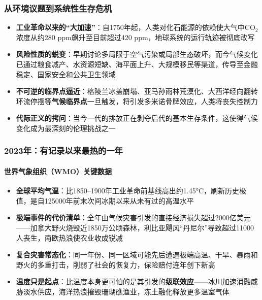 \documentclass[11pt]{beamer}
\begin{document}
\begin{frame}
\frametitle{从环境议题到系统性生存危机}
\begin{itemize}
    \item \textbf{工业革命以来的“大加速”}：自1750年起，人类对化石能源的依赖使大气中CO$_2$浓度从约280 ppm飙升至目前超过420 ppm，地球系统的运行轨迹被彻底改写
    \item \textbf{风险性质的蜕变}：早期讨论多局限于空气污染或局部生态破坏，而今气候变化已通过\alert{粮食减产、水资源短缺、海平面上升、大规模移民}等渠道，传导至金融稳定、国家安全和公共卫生领域
    \item \textbf{不可逆的临界点逼近}：格陵兰冰盖崩塌、亚马孙雨林荒漠化、大西洋经向翻转环流停摆等\textbf{气候临界点}一旦触发，将引发多米诺骨牌效应，人类将丧失控制力
    \item \textbf{代际正义的拷问}：当今一代的排放正在剥夺后代的基本生存条件，这使得气候变化成为\alert{最深刻的伦理挑战之一}
\end{itemize}
\end{frame}

\begin{frame}
\frametitle{2023年：有记录以来最热的一年}
\framesubtitle{世界气象组织（WMO）关键数据}
\begin{itemize}
    \item \textbf{全球平均气温}：比1850–1900年工业革命前基线高出约1.45°C，刷新历史极值，是自125000年前末次间冰期以来从未有过的高温水平
    \item \textbf{极端事件的代价清单}：全年由气候灾害引发的直接经济损失超过2000亿美元——加拿大野火烧毁近1850万公顷森林，利比亚飓风“丹尼尔”导致超过11000人丧生，南欧热浪使农业收成锐减
    \item \textbf{复合灾害常态化}：同一年份、同一区域可能先后遭遇\alert{极端高温、干旱、暴雨和野火}的多重打击，削弱了社会的恢复力，保险赔付连年创下新高
    \item \textbf{温度只是起点}：比温度本身更可怕的是其引发的\textbf{级联效应}——冰川加速消融威胁淡水供应，海洋热浪摧毁珊瑚礁渔业，冻土融化释放更多温室气体
\end{itemize}
\end{frame}
\end{document}

